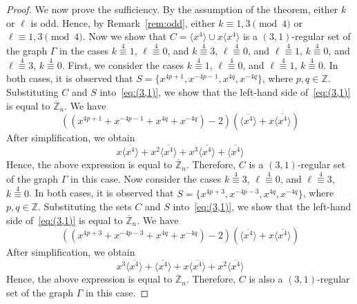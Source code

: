 \documentclass[12pt]{article}
\begin{document}
\begin{proof}
 We now prove the sufficiency. By the assumption of the theorem, either $k$ or $\ell$ is odd. Hence, by Remark~\ref{rem:odd}, either $k\equiv1,3\pmod{4}$ or $\ell\equiv1,3\pmod{4}$. Now we show that
 $
 C=\langle x^{4}\rangle \cup x\langle x^{4}\rangle
 $
 is a $(3,1)$-regular set of the graph $\Gamma$ in the cases
 $k\stackrel{4}{\equiv}1$, $\ell\stackrel{4}{\equiv}0$, and
 $k\stackrel{4}{\equiv}3$, $\ell\stackrel{4}{\equiv}0$, and
 $\ell\stackrel{4}{\equiv}1$, $k\stackrel{4}{\equiv}0$, and
 $\ell\stackrel{4}{\equiv}3$, $k\stackrel{4}{\equiv}0$.
 First, we consider the cases
 $k\stackrel{4}{\equiv}1$, $\ell\stackrel{4}{\equiv}0$, and
 $\ell\stackrel{4}{\equiv}1$, $k\stackrel{4}{\equiv}0$.
 In both cases, it is observed that
 $S=\{x^{4p+1},x^{-4p-1},x^{4q},x^{-4q}\}$, where $p,q\in\mathbb{Z}$.
 Substituting $C$ and $S$ into~\eqref{eq:(3,1)}, we show that the left-hand side of~\eqref{eq:(3,1)} is equal to $\overline{\mathbb{Z}}_{n}$. We have
\[
\left(\left(x^{4p+1}+x^{-4p-1}+x^{4q}+x^{-4q}\right)-2\right)
\left(\overline{\langle x^{4}\rangle}+x\overline{\langle x^{4}\rangle}\right)
\]
 After simplification, we obtain
 \[
 x\overline{\langle x^{4}\rangle}
 +x^{2}\overline{\langle x^{4}\rangle}
 +x^{3}\overline{\langle x^{4}\rangle}
 +\overline{\langle x^{4}\rangle}
 \]
 Hence, the above expression is equal to $\overline{\mathbb{Z}}_{n}$. Therefore, $C$ is a $(3,1)$-regular set of the graph $\Gamma$ in this case.
 Now consider the cases
 $k\stackrel{4}{\equiv}3$, $\ell\stackrel{4}{\equiv}0$, and
 $\ell\stackrel{4}{\equiv}3$, $k\stackrel{4}{\equiv}0$.
 In both cases, it is observed that
 $S=\{x^{4p+3},x^{-4p-3},x^{4q},x^{-4q}\}$, where $p,q\in\mathbb{Z}$.
 Substituting the sets $C$ and $S$ into~\eqref{eq:(3,1)}, we show that the left-hand side of~\eqref{eq:(3,1)} is equal to $\overline{\mathbb{Z}}_{n}$. We have
\[
\left(\left(x^{4p+3}+x^{-4p-3}+x^{4q}+x^{-4q}\right)-2\right)
\left(\overline{\langle x^{4}\rangle}+x\overline{\langle x^{4}\rangle}\right)
\]
 After simplification, we obtain
 \[
 x^{3}\overline{\langle x^{4}\rangle}
 +\overline{\langle x^{4}\rangle}
 +x\overline{\langle x^{4}\rangle}
 +x^{2}\overline{\langle x^{4}\rangle}
 \]
 Hence, the above expression is equal to $\overline{\mathbb{Z}}_{n}$. Therefore, $C$ is also a $(3,1)$-regular set of the graph $\Gamma$ in this case.


\end{proof}
\end{document}
